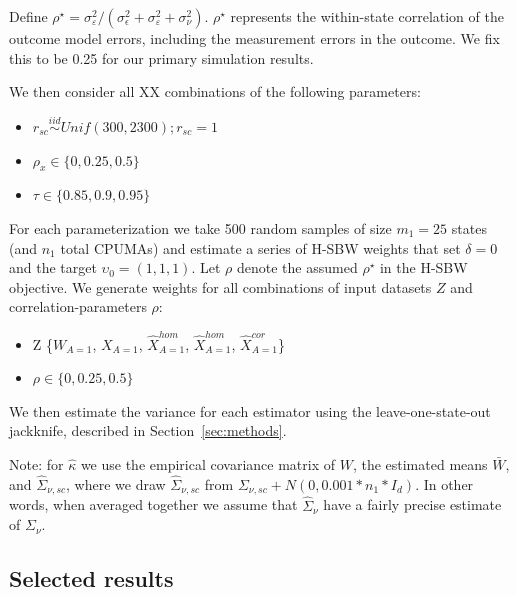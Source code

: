 Define $\rho^\star = \sigma^2_{\varepsilon}/(\sigma^2_{\epsilon} + \sigma^2_{\varepsilon} + \sigma^2_{\nu})$. $\rho^\star$ represents the within-state correlation of the outcome model errors, including the measurement errors in the outcome. We fix this to be 0.25 for our primary simulation results.

We then consider all XX combinations of the following parameters:

\begin{itemize}
    \item $r_{sc} \stackrel{iid}\sim Unif(300, 2300); r_{sc} = 1$ 
    \item $\rho_x \in \{0, 0.25, 0.5\}$
    \item $\tau \in \{0.85, 0.9, 0.95\}$
\end{itemize}

For each parameterization we take 500 random samples of size $m_1 = 25$ states (and $n_1$ total CPUMAs) and estimate a series of H-SBW weights that set $\delta = 0$ and the target $\upsilon_0 = (1, 1, 1)$. Let $\rho$ denote the assumed $\rho^\star$ in the H-SBW objective. We generate weights for all combinations of input datasets $Z$ and correlation-parameters $\rho$:

\begin{itemize}
    \item Z \in \{$W_{A=1}$, $X_{A=1}$, $\hat{X}_{A=1}^{hom}$, $\hat{X}_{A=1}^{hom}$, $\hat{X}_{A=1}^{cor}$\}
    \item $\rho \in \{0, 0.25, 0.5\}$
\end{itemize}

We then estimate the variance for each estimator using the leave-one-state-out jackknife, described in Section~\ref{sec:methods}. 

Note: for $\hat{\kappa}$ we use the empirical covariance matrix of $W$, the estimated means $\bar{W}$, and $\hat{\Sigma}_{\nu, sc}$, where we draw $\hat{\Sigma}_{\nu, sc}$ from $\Sigma_{\nu, sc} + N(0, 0.001*n_1*I_d)$. In other words, when averaged together we assume that $\hat{\Sigma}_{\nu}$ have a fairly precise estimate of $\Sigma_{\nu}$.

\subsection{Selected results}

